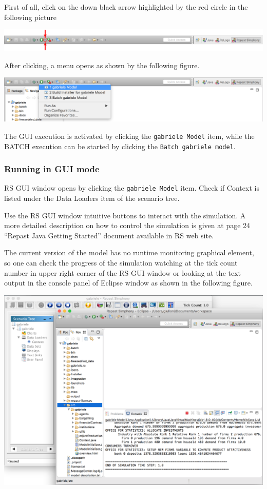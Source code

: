 \documentclass{book}
\begin{document}
First of all, click on the down black arrow highlighted by the red circle in the following picture

\vskip2mm
\noindent
\includegraphics[scale=0.195]{fig_gabriele_rs_execution1a}

After clicking, a menu opens as shown by the following figure. 

\vskip2mm
\noindent
\includegraphics[scale=0.35]{fig_gabriele_rs_execution2}

\vskip2mm
The GUI execution is activated by clicking the \verb+gabriele Model+ item, while the BATCH execution can be started by clicking the \verb+Batch gabriele model+.


\subsubsection{Running in GUI mode}

RS GUI window opens by clicking the \verb+gabriele Model+ item. Check if Context is listed under the Data Loaders item of the scenario tree.

Use the RS GUI window intuitive buttons to interact with the simulation. A more detailed description on how to control the simulation is given at page 24 ``Repast Java Getting Started'' document available in RS web site.

The current version of the model has no runtime monitoring graphical element, so one can check the progress of the simulation watching at the tick count number in upper right corner of the RS GUI window or looking at the text output in the console panel of Eclipse window as shown in the following figure. 

\vskip2mm
\noindent
\includegraphics[scale=0.35]{fig_gabriele_rs_gui7}
\end{document}
